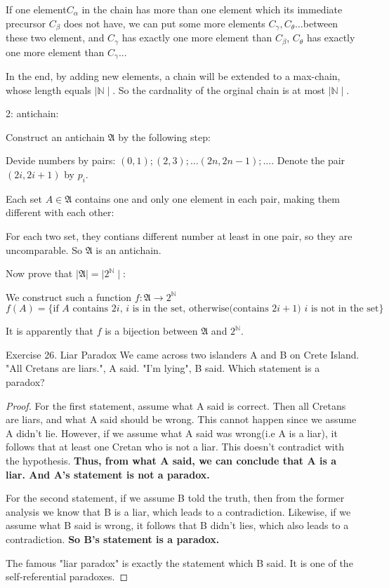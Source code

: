 \documentclass[UTF8, a4paper, linespread=1.5]{article}
\begin{document}
If one element$C_\alpha$ in the chain has more than one element which its immediate precursor $C_\beta$ 
does not have, we can put some more elements $C_\gamma, C_\theta\dots$between these two element, and 
$C_\gamma$ has exactly one more element than $C_\beta$, $C_\theta$ has exactly one more element than $C_\gamma$...

In the end, by adding new elements, a chain will be extended to a max-chain, whose length equals $\mid\mathbb N\mid$. 
So the cardnality of the orginal chain is at most $\mid\mathbb N\mid$. 

2: antichain:

Construct an antichain $\mathfrak A$ by the following step:

Devide numbers by pairs: $(0, 1);(2, 3);\dots (2n, 2n - 1);\dots$. Denote the pair $(2i, 2i + 1)$ by $p_i$.

Each set $A\in\mathfrak A$ contains one and only one element in each pair, making them different with each other:

For each two set, they contians different number at least in one pair, so they are uncomparable.
So $\mathfrak A$ is an antichain.

Now prove that $\mid\mathfrak A\mid=\mid2^{\mathbb N}\mid$:

We construct such a function $f:\mathfrak A\rightarrow 2^{\mathbb N}$
$$f(A)=\{\text{if $A$ contains $2i$, $i$ is in the set, otherwise(contains $2i+1$) $i$ is not in the set}\}$$

It is apparently that $f$ is a bijection between $\mathfrak A$ and $2^{\mathbb N}$.


\begin{thm}{Exercise 26. Liar Paradox}{}
    We came across two islanders A and B on Crete Island. "All Cretans are liars.", A said. "I'm lying", B said. Which statement is a paradox?
\end{thm}

\begin{proof}
    For the first statement, assume what A said is correct. Then all Cretans are liars, and what A said should be wrong. This cannot happen since we assume A didn't lie. However, if we assume what A said was wrong(i.e A is a liar), it follows that at least one Cretan who is not a liar. This doesn't contradict with the hypothesis. \textbf{Thus, from what A said, we can conclude that A is a liar. And A's statement is not a paradox.}

    For the second statement, if we assume B told the truth, then from the former analysis we know that B is a liar, which leads to a contradiction. Likewise, if we assume what B said is wrong, it follows that B didn't lies, which also leads to a contradiction. \textbf{So B's statement is a paradox.}

    The famous "liar paradox" is exactly the statement which B said. It is one of the self-referential paradoxes.
\end{proof}
\end{document}
